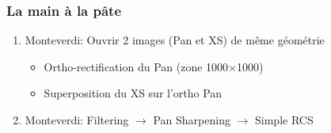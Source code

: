 \documentclass[compress]{beamer}
\begin{document}
\begin{frame}
\frametitle{La main à la pâte}
\begin{enumerate}
\item Monteverdi: Ouvrir 2 images (Pan et XS) de même géométrie
  \begin{itemize}
  \item Ortho-rectification du Pan (zone 1000$\times$1000)
  \item Superposition du XS sur l'ortho Pan
  \end{itemize}
\item Monteverdi: Filtering $\rightarrow$ Pan Sharpening $\rightarrow$
  Simple RCS
\end{enumerate}
\end{frame}
\end{document}
